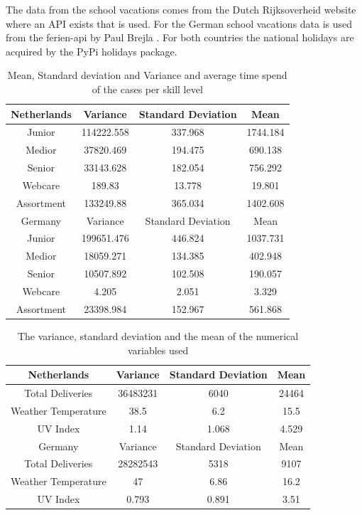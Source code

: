 The data from the school vacations comes from the Dutch Rijksoverheid website where an API exists that is used. For the German school vacations data is used from the ferien-api by Paul Brejla \citep{BrejlaDeutscheFerientermine}. For both countries the national holidays are acquired by the PyPi holidays package.\\

\begin{table}[]
    \centering
    \begin{tabular}{|c|c c c|}\hline
        Netherlands & Variance & Standard Deviation & Mean\\
        \hline
        Junior & 114222.558 & 337.968 & 1744.184\\
        Medior & 37820.469 & 194.475 & 690.138\\
        Senior & 33143.628 & 182.054 & 756.292\\
        Webcare & 189.83 & 13.778 & 19.801\\
        Assortment & 133249.88 & 365.034 & 1402.608\\
        \hline
        Germany & Variance & Standard Deviation & Mean\\
        \hline
        Junior & 199651.476 & 446.824 & 1037.731\\
        Medior & 18059.271 & 134.385 & 402.948\\
        Senior & 10507.892 & 102.508 & 190.057\\
        Webcare & 4.205 & 2.051 & 3.329\\
        Assortment & 23398.984 & 152.967 & 561.868\\\hline
    \end{tabular}
    \caption{Mean, Standard deviation and Variance and average time spend of the cases per skill level}
    \label{tab:mean_var}
\end{table}

\begin{table}[]
    \centering
    \begin{tabular}{|c|c c c|}\hline
        Netherlands & Variance & Standard Deviation & Mean\\
        \hline
        Total Deliveries & 36483231 & 6040 & 24464\\
        Weather Temperature & 38.5 & 6.2 & 15.5\\
        UV Index & 1.14 & 1.068 & 4.529\\ \hline
        Germany & Variance & Standard Deviation & Mean\\ 
        \hline
        Total Deliveries & 28282543 & 5318 & 9107\\
        Weather Temperature & 47 & 6.86 & 16.2\\
        UV Index & 0.793 & 0.891 & 3.51\\
    \hline
    \end{tabular}
    \caption{The variance, standard deviation and the mean of the numerical variables used}
    \label{tab:coninuous_variables_mean_var}
\end{table}

